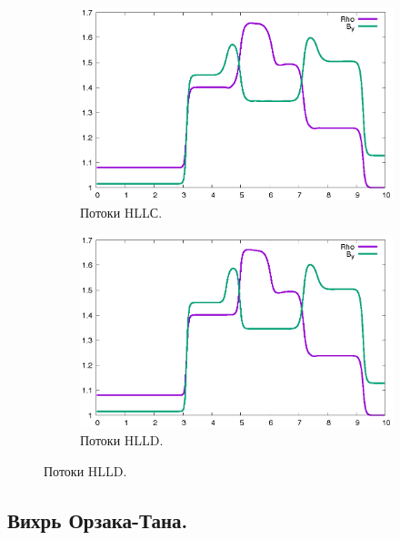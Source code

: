 \documentclass[14pt, a4paper, fleqn]{extreport}
\begin{document}
	\begin{figure}[H]
		\centering
		\caption{$\rho$ и $B_y$ при $t = 1800\tau$.}
		\begin{subfigure}{0.75\textwidth}
			\centering
			\caption{Потоки HLLС.}
			\includegraphics[width=\textwidth]{1D_HLLC.eps}
		\end{subfigure}
		\begin{subfigure}{0.75\textwidth}
			\centering
			\caption{Потоки HLLD.}
			\includegraphics[width=\textwidth]{1D_HLLD.eps}
		\end{subfigure}
	\end{figure}

	\subsection{Вихрь Орзака-Тана.}
\end{document}
